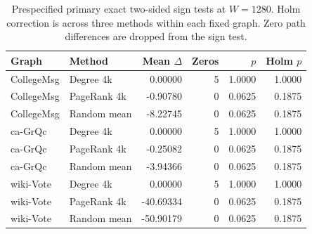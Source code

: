 \begin{table}[htbp]
\caption{Prespecified primary exact two-sided sign tests at $W=1280$. Holm correction is across three methods within each fixed graph. Zero path differences are dropped from the sign test.}\label{tab:tests}
\begin{tabular}{llrrrr}
\toprule
Graph & Method & Mean $\Delta$ & Zeros & $p$ & Holm $p$ \\
\midrule
CollegeMsg & Degree 4k & 0.00000 & 5 & 1.0000 & 1.0000 \\
CollegeMsg & PageRank 4k & -0.90780 & 0 & 0.0625 & 0.1875 \\
CollegeMsg & Random mean & -8.22745 & 0 & 0.0625 & 0.1875 \\
ca-GrQc & Degree 4k & 0.00000 & 5 & 1.0000 & 1.0000 \\
ca-GrQc & PageRank 4k & -0.25082 & 0 & 0.0625 & 0.1875 \\
ca-GrQc & Random mean & -3.94366 & 0 & 0.0625 & 0.1875 \\
wiki-Vote & Degree 4k & 0.00000 & 5 & 1.0000 & 1.0000 \\
wiki-Vote & PageRank 4k & -40.69334 & 0 & 0.0625 & 0.1875 \\
wiki-Vote & Random mean & -50.90179 & 0 & 0.0625 & 0.1875 \\
\bottomrule
\end{tabular}
\end{table}

